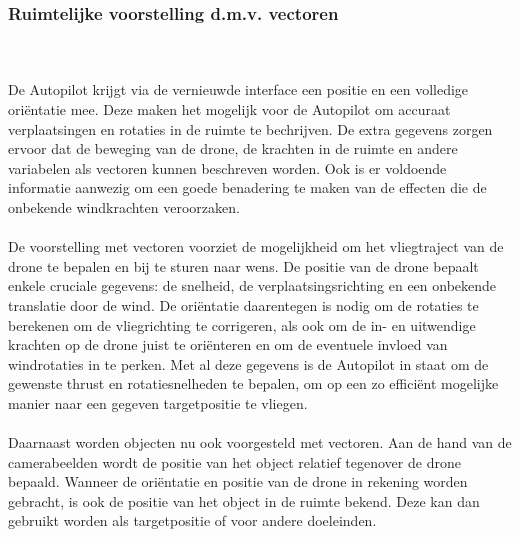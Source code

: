 \subsubsection{Ruimtelijke voorstelling d.m.v. vectoren}
\\
\\
De Autopilot krijgt via de vernieuwde interface een positie en een volledige ori\"entatie mee. Deze maken het mogelijk voor de Autopilot om accuraat verplaatsingen en rotaties in de ruimte te bechrijven. De extra gegevens zorgen ervoor dat de beweging van de drone, de krachten in de ruimte en andere variabelen als vectoren kunnen beschreven worden. Ook is er voldoende informatie aanwezig om een goede benadering te maken van de effecten die de onbekende windkrachten veroorzaken.
\\
\\
De voorstelling met vectoren voorziet de mogelijkheid om het vliegtraject van de drone te bepalen en bij te sturen naar wens. De positie van de drone bepaalt enkele cruciale gegevens: de snelheid, de verplaatsingsrichting en een onbekende translatie door de wind. De ori\"entatie daarentegen is nodig om de rotaties te berekenen om de vliegrichting te corrigeren, als ook om de in- en uitwendige krachten op de drone juist te ori\"enteren en om de eventuele invloed van windrotaties in te perken. Met al deze gegevens is de Autopilot in staat om de gewenste thrust en rotatiesnelheden te bepalen, om op een zo effici\"ent mogelijke manier naar een gegeven targetpositie te vliegen.
\\
\\
Daarnaast worden objecten nu ook voorgesteld met vectoren. Aan de hand van de camerabeelden wordt de positie van het object relatief tegenover de drone bepaald. Wanneer de ori\"entatie en positie van de drone in rekening worden gebracht, is ook de positie van het object in de ruimte bekend. Deze kan dan gebruikt worden als targetpositie of voor andere doeleinden.